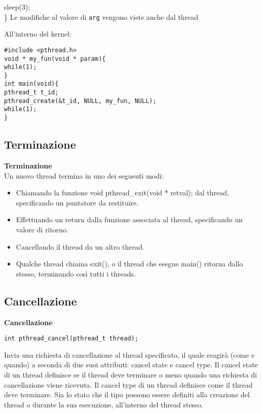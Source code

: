 \begin{flushleft}
\begin{flushleft}
{    \halftab sleep(3);\\
    \} }
    Le modifiche al valore di \texttt{arg} vengono viste anche dal thread 
  \end{flushleft}
  \begin{flushleft}
    All'interno del kernel: \\
    \begin{flushleft}
      \texttt{\#include <pthread.h> \\
      void * my\_fun(void * param)\{ \\
      \halftab while(1);\\
      \}\\
      int main(void)\{ \\
      \halftab pthread\_t t\_id;\\
      \halftab pthread\_create(\&t\_id, NULL, my\_fun, NULL);\\
      \halftab while(1);\\
      \} }
    \end{flushleft}
  \end{flushleft}
  \subsection{Terminazione}
  \begin{flushleft}
    \textbf{Terminazione}\\
    Un nuovo thread termina in uno dei seguenti modi:
    \begin{itemize}
      \item Chiamando la funzione void pthread\_exit(void * retval); dal thread, 
      specificando un puntatore da restituire.
      \item Effettuando un return dalla funzione associata al thread, specificando un valore 
      di ritorno.
      \item Cancellando il thread da un altro thread.
      \item Qualche thread chiama exit(), o il thread che esegue main() ritorna dallo 
      stesso, terminando così tutti i threads.
    \end{itemize}
  \end{flushleft}
  \subsection{Cancellazione}
  \begin{flushleft}
    \textbf{Cancellazione}\\
    \begin{flushleft}
      \texttt{int pthread\_cancel(pthread\_t thread);}
    \end{flushleft}
    Invia una richiesta di cancellazione al thread specificato, il quale reagirà (come e 
    quando) a seconda di due suoi attributi: cancel state e cancel type. 
    Il cancel state di un thread definisce se il thread deve terminare o meno quando una 
    richiesta di cancellazione viene ricevuta. Il cancel type di un thread definisce come il 
    thread deve terminare. 
    Sia lo stato che il tipo possono essere definiti alla creazione del thread o durante la 
    sua esecuzione, all’interno del thread stesso.
  \end{flushleft}

\end{flushleft}
